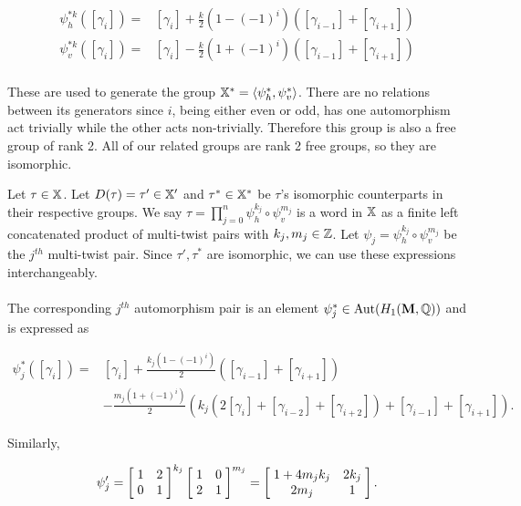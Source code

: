 \documentclass[a4paper, 11pt]{article}
\def\bM{\mathbf{M}}
\def\<{\langle} \def\>{\rangle}
\def\Aut{\mathrm{Aut}}
\begin{document}
\begin{align*}
\psi^{*k}_h([\gamma_i])=&[\gamma_i] + \frac{k}{2}(1-(-1)^i)([\gamma_{i-1}]+[\gamma_{i+1}])\\
\psi^{*k}_v([\gamma_i])=&[\gamma_i] - \frac{k}{2}(1+(-1)^i)([\gamma_{i-1}]+[\gamma_{i+1}])\\
\end{align*}

These are used to generate the group $\XX^*=\<\psi^{*}_h,\psi^{*}_v \>$. There are no relations between its generators since $i$, being either even or odd, has one automorphism act trivially while the other acts non-trivially. Therefore this group is also a free group of rank 2. All of our related groups are rank 2 free groups, so they are isomorphic.


Let $\tau\in\mathbb{X}$. Let $D(\tau)=\tau'\in\mathbb{X}'$ and $\tau^*\in\mathbb{X}^*$ be $\tau$'s isomorphic counterparts in their respective groups. We say $\tau=\prod_{j=0}^{n}\psi_h^{k_j}\circ\psi_v^{m_j}$ is a word in $\mathbb{X}$ as a finite left concatenated product of multi-twist pairs with $k_j,m_j\in\mathbb{Z}$. Let $\psi_j=\psi_h^{k_j}\circ\psi_v^{m_j}$ be the $j^{th}$ multi-twist pair. Since $\tau',\tau^*$ are isomorphic, we can use these expressions interchangeably. \\\\
The corresponding $j^{th}$ automorphism pair is an element $\psi_j^*\in\Aut(H_1(\bM,\QQ))$ and is expressed as 

\begin{align*}
\psi_j^*([\gamma_i])=&[\gamma_i]+\frac{k_j(1-(-1)^i)}{2}([\gamma_{i-1}]+[\gamma_{i+1}])\\&-\frac{m_j(1+(-1)^i)}{2}(k_j(2[\gamma_i]+[\gamma_{i-2}]+[\gamma_{i+2}]) +[\gamma_{i-1}]+[\gamma_{i+1}]).
\end{align*}

\noindent Similarly,

\begin{align*}
\psi_j'=\left[ \hspace{1mm} \begin{matrix}
				1 &   2\\
				0 & 1
			\end{matrix}\hspace{1mm}\right]^{k_j}\left[ \hspace{1mm} \begin{matrix}
							1 &   0\\
							2 & 1
						\end{matrix}\hspace{1mm}\right]^{m_j}=\left[ \hspace{1mm} \begin{matrix}
										1+4m_jk_j &   2k_j\\
										2m_j & 1
									\end{matrix}\hspace{1mm}\right].
\end{align*}
\end{document}
